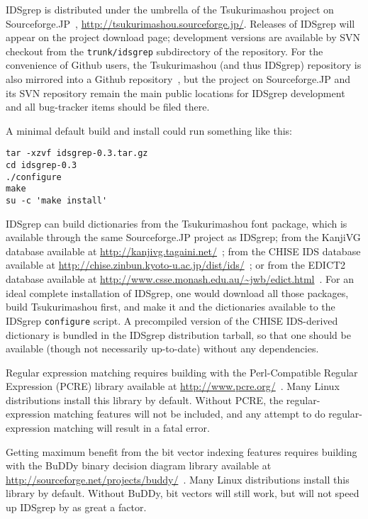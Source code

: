 \documentclass[twocolumn]{report}
\begin{document}
IDSgrep is distributed under the umbrella of the Tsukurimashou project on
Sourceforge.JP~\cite{Tsukurimashou},
\url{http://tsukurimashou.sourceforge.jp/}.  Releases of IDSgrep
will appear on the project download page; development versions are available
by SVN checkout from the \texttt{trunk/idsgrep} subdirectory of the
repository.  For the convenience of Github users, the Tsukurimashou (and
thus IDSgrep) repository is also mirrored into a Github
repository~\cite{TsukuGithub}, but the project on Sourceforge.JP and its SVN
repository remain the main public locations for IDSgrep development and all
bug-tracker items should be filed there.

A minimal default build and install could run something like this:
\begin{verbatim}
tar -xzvf idsgrep-0.3.tar.gz
cd idsgrep-0.3
./configure
make
su -c 'make install'
\end{verbatim}

IDSgrep can build dictionaries
from the Tsukurimashou font package, which is available through the same
Sourceforge.JP project as IDSgrep; from the KanjiVG database available at
\url{http://kanjivg.tagaini.net/}~\cite{KanjiVG}; from the CHISE IDS
database available at
\url{http://chise.zinbun.kyoto-u.ac.jp/dist/ids/}~\cite{CHISE};
or from the EDICT2 database available at
\url{http://www.csse.monash.edu.au/~jwb/edict.html}~\cite{EDICT2}.  For an
ideal complete installation of IDSgrep, one would download all those
packages, build Tsukurimashou first, and make it and the dictionaries
available to the IDSgrep \texttt{configure} script.
A precompiled version of the CHISE IDS-derived dictionary is bundled
in the IDSgrep distribution tarball, so that one should be available (though
not necessarily up-to-date) without any dependencies.

Regular expression matching requires building with the Perl-Compatible
Regular Expression (PCRE) library available at
\url{http://www.pcre.org/}~\cite{PCRE}.  Many Linux distributions install
this library by default.  Without PCRE, the regular-expression matching
features will not be included, and any attempt to do regular-expression
matching will result in a fatal error.

Getting maximum benefit from the bit vector indexing features requires
building with the BuDDy binary decision diagram library available at
\url{http://sourceforge.net/projects/buddy/}~\cite{BuDDy}.  Many Linux
distributions install this library by default.  Without BuDDy, bit vectors
will still work, but will not speed up IDSgrep by as great a factor.
\end{document}
